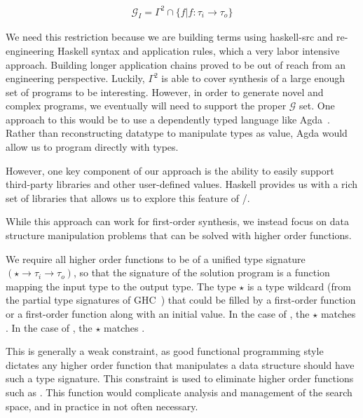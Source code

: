 \begin{gather*}
\mathcal{G}_I = \Gamma^2 \cap \{f | f : \tau_i \to \tau_o\}
\end{gather*}

We need this restriction because we are building terms using haskell-src and re-engineering Haskell syntax and application rules, which a very labor intensive approach.
Building longer application chains proved to be out of reach from an engineering perspective.
Luckily, $\Gamma^2$ is able to cover synthesis of a large enough set of programs to be interesting.
However, in order to generate novel and complex programs, we eventually will need to support the proper $\mathcal{G}$ set.
One approach to this would be to use a dependently typed language like Agda~\cite{}.
Rather than reconstructing datatype to manipulate types as value, Agda would allow us to program directly with types.

However, one key component of our approach is the ability to easily support third-party libraries and other user-defined values.
Haskell provides us with a rich set of libraries that allows us to explore this feature of \ourTool/.

While this approach can work for first-order synthesis, we instead focus on data structure manipulation problems that can be solved with higher order functions.

We require all higher order functions to be of a unified type signature $(\star \to \tau_i \to \tau_o)$, so that the signature of the solution program is a function mapping the input type to the output type. 
The type $\star$ is a type wildcard (from the partial type signatures of GHC~\cite{ghc}) that could be filled by a first-order function or a first-order function along with an initial value.
In the case of , the $\star$ matches .
In the case of , the $\star$ matches .

This is generally a weak constraint, as good functional programming style dictates any higher order function that manipulates a data structure should have such a type signature.
This constraint is used to eliminate higher order functions such as .
This function would complicate analysis and management of the search space, and in practice in not often necessary.


